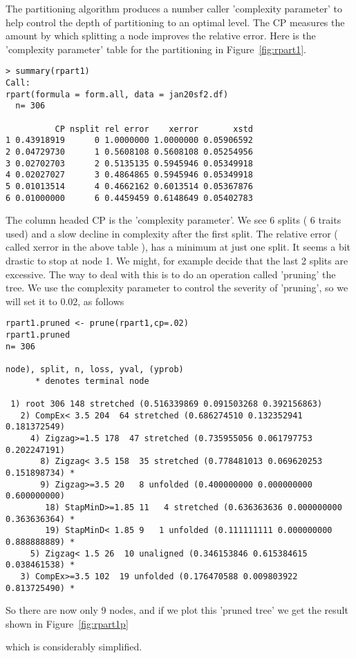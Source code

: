 \documentclass[titlepage]{article}  %
\begin{document}
The partitioning algorithm produces a number caller 'complexity parameter' to help control the depth of partitioning to an optimal level.  The CP measures the amount by which splitting a node improves the relative error. Here is the 'complexity parameter' table for the partitioning in Figure~\ref{fig:rpart1}.
\begin{verbatim}
> summary(rpart1)
Call:
rpart(formula = form.all, data = jan20sf2.df)
  n= 306 

          CP nsplit rel error    xerror       xstd
1 0.43918919      0 1.0000000 1.0000000 0.05906592
2 0.04729730      1 0.5608108 0.5608108 0.05254956
3 0.02702703      2 0.5135135 0.5945946 0.05349918
4 0.02027027      3 0.4864865 0.5945946 0.05349918
5 0.01013514      4 0.4662162 0.6013514 0.05367876
6 0.01000000      6 0.4459459 0.6148649 0.05402783
\end{verbatim}
 The column headed CP is the 'complexity parameter'. We see 6 splits ( 6 traits used) and a slow decline in complexity after the first split. The relative error ( called xerror in the above table ), has a minimum at just one split. It seems a bit drastic to stop at node 1.  We might, for example decide that the last 2 splits  are excessive. The way to deal with this is to do an operation called 'pruning' the tree. We use the complexity parameter to control the severity of 'pruning', so we will set it to $0.02$, as follows
\begin{verbatim}
rpart1.pruned <- prune(rpart1,cp=.02)
rpart1.pruned
n= 306 

node), split, n, loss, yval, (yprob)
      * denotes terminal node

 1) root 306 148 stretched (0.516339869 0.091503268 0.392156863)  
   2) CompEx< 3.5 204  64 stretched (0.686274510 0.132352941 0.181372549)  
     4) Zigzag>=1.5 178  47 stretched (0.735955056 0.061797753 0.202247191)  
       8) Zigzag< 3.5 158  35 stretched (0.778481013 0.069620253 0.151898734) *
       9) Zigzag>=3.5 20   8 unfolded (0.400000000 0.000000000 0.600000000)  
        18) StapMinD>=1.85 11   4 stretched (0.636363636 0.000000000 0.363636364) *
        19) StapMinD< 1.85 9   1 unfolded (0.111111111 0.000000000 0.888888889) *
     5) Zigzag< 1.5 26  10 unaligned (0.346153846 0.615384615 0.038461538) *
   3) CompEx>=3.5 102  19 unfolded (0.176470588 0.009803922 0.813725490) *
\end{verbatim}
So there are now only 9 nodes, and if we plot this 'pruned tree' we get the result shown in Figure~\ref{fig:rpart1p}

which is considerably simplified. 
\end{document}
